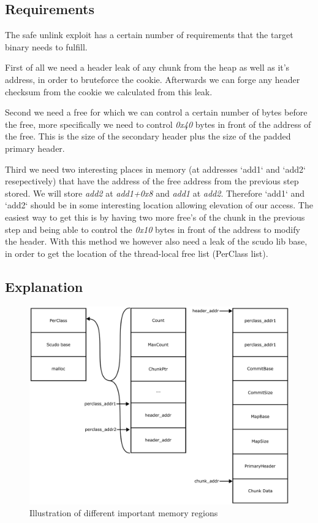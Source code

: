 \documentclass[a4paper,11pt,oneside]{report}
\begin{document}
\subsection{Requirements}

The safe unlink exploit has a certain number of requirements that the target binary needs
to fulfill.

First of all we need a header leak of any chunk from the heap as well as it's address, in
order to bruteforce the cookie. Afterwards we can forge any header checksum from the
cookie we calculated from this leak.

Second we need a free for which we can control a certain number of bytes before the free,
more specifically we need to control \emph{0x40} bytes in front of the address of the
free. This is the size of the secondary header plus the size of the padded primary header.

Third we need two interesting places in memory (at addresses `add1` and `add2`
resepectively) that have the address of the free address from the previous step stored. We
will store \emph{add2} at \emph{add1+0x8} and \emph{add1} at \emph{add2}. Therefore `add1`
and `add2` should be in some interesting location allowing elevation of our access.  The
easiest way to get this is by having two more free's of the chunk in the previous step and
being able to control the \emph{0x10} bytes in front of the address to modify the
header. With this method we however also need a leak of the scudo lib base, in order to
get the location of the thread-local free list (PerClass list).

\subsection{Explanation}

\begin{figure}[h!]
  \centering
  \includegraphics[width=\linewidth]{figures/SafeUnlinkMemory.png}
  \caption{Illustration of different important memory regions}
  \label{fig:SafeUnlinkMemory}
\end{figure}
\end{document}
